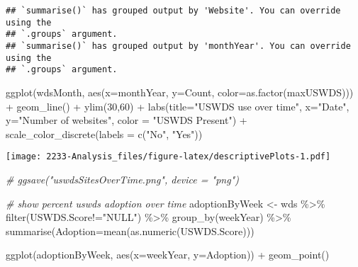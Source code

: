 \documentclass[
]{article}
\newenvironment{Shaded}{\begin{snugshade}}{\end{snugshade}}
\newcommand{\AttributeTok}[1]{\textcolor[rgb]{0.77,0.63,0.00}{#1}}
\newcommand{\CommentTok}[1]{\textcolor[rgb]{0.56,0.35,0.01}{\textit{#1}}}
\newcommand{\DecValTok}[1]{\textcolor[rgb]{0.00,0.00,0.81}{#1}}
\newcommand{\FunctionTok}[1]{\textcolor[rgb]{0.00,0.00,0.00}{#1}}
\newcommand{\NormalTok}[1]{#1}
\newcommand{\OtherTok}[1]{\textcolor[rgb]{0.56,0.35,0.01}{#1}}
\newcommand{\SpecialCharTok}[1]{\textcolor[rgb]{0.00,0.00,0.00}{#1}}
\newcommand{\StringTok}[1]{\textcolor[rgb]{0.31,0.60,0.02}{#1}}
\begin{document}
\begin{verbatim}
## `summarise()` has grouped output by 'Website'. You can override using the
## `.groups` argument.
## `summarise()` has grouped output by 'monthYear'. You can override using the
## `.groups` argument.
\end{verbatim}

\begin{Shaded}
\begin{Highlighting}[]
\FunctionTok{ggplot}\NormalTok{(wdsMonth, }\FunctionTok{aes}\NormalTok{(}\AttributeTok{x=}\NormalTok{monthYear, }\AttributeTok{y=}\NormalTok{Count, }
  \AttributeTok{color=}\FunctionTok{as.factor}\NormalTok{(maxUSWDS))) }\SpecialCharTok{+}
  \FunctionTok{geom\_line}\NormalTok{() }\SpecialCharTok{+}
  \FunctionTok{ylim}\NormalTok{(}\DecValTok{30}\NormalTok{,}\DecValTok{60}\NormalTok{) }\SpecialCharTok{+}
  \FunctionTok{labs}\NormalTok{(}\AttributeTok{title=}\StringTok{"USWDS use over time"}\NormalTok{, }\AttributeTok{x=}\StringTok{"Date"}\NormalTok{, }
       \AttributeTok{y=}\StringTok{"Number of websites"}\NormalTok{, }\AttributeTok{color =} \StringTok{"USWDS Present"}\NormalTok{) }\SpecialCharTok{+}
  \FunctionTok{scale\_color\_discrete}\NormalTok{(}\AttributeTok{labels =} \FunctionTok{c}\NormalTok{(}\StringTok{"No"}\NormalTok{, }\StringTok{"Yes"}\NormalTok{))}
\end{Highlighting}
\end{Shaded}

\texttt{[image: 2233-Analysis\_files/figure-latex/descriptivePlots-1.pdf]}

\begin{Shaded}
\begin{Highlighting}[]
\CommentTok{\# ggsave("uswdsSitesOverTime.png", device = "png")}


\CommentTok{\# show percent uswds adoption over time}
\NormalTok{adoptionByWeek }\OtherTok{\textless{}{-}}\NormalTok{ wds }\SpecialCharTok{\%\textgreater{}\%} 
  \FunctionTok{filter}\NormalTok{(USWDS.Score}\SpecialCharTok{!=}\StringTok{"NULL"}\NormalTok{) }\SpecialCharTok{\%\textgreater{}\%}
  \FunctionTok{group\_by}\NormalTok{(weekYear) }\SpecialCharTok{\%\textgreater{}\%}
  \FunctionTok{summarise}\NormalTok{(}\AttributeTok{Adoption=}\FunctionTok{mean}\NormalTok{(}\FunctionTok{as.numeric}\NormalTok{(USWDS.Score)))}

\FunctionTok{ggplot}\NormalTok{(adoptionByWeek, }\FunctionTok{aes}\NormalTok{(}\AttributeTok{x=}\NormalTok{weekYear, }\AttributeTok{y=}\NormalTok{Adoption)) }\SpecialCharTok{+}
  \FunctionTok{geom\_point}\NormalTok{()}
\end{Highlighting}
\end{Shaded}
\end{document}
